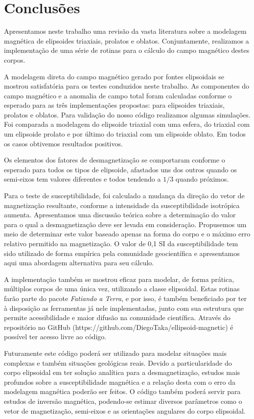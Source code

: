 \chapter{Conclusões}

Apresentamos neste trabalho uma revisão da vasta literatura sobre a modelagem magnética de elipsoides triaxiais, prolatos e oblatos. Conjuntamente, realizamos a implementação de uma série de rotinas para o cálculo do campo magnético destes corpos.

A modelagem direta do campo magnético gerado por fontes elipsoidais se mostrou satisfatória para os testes conduzidos neste trabalho. As componentes do campo magnético e a anomalia de campo total foram calculadas conforme o esperado para as três implementações propostas: para elipsoides triaxiais, prolatos e oblatos.
Para validação do nosso código realizamos algumas simulações. Foi comparada a modelagem do elipsoide triaxial com uma esfera, do triaxial com um elipsoide prolato e por último do triaxial com um elipsoide oblato. Em todos os casos obtivemos resultados positivos.

Os elementos dos fatores de desmagnetização se comportaram conforme o esperado para todos os tipos de elipsoide, afastados uns dos outros quando os semi-eixos tem valores diferentes e todos tendendo a $1/3$ quando próximos.

Para o teste de susceptibilidade, foi calculado a mudança da direção do vetor de magnetização resultante, conforme a intensidade da susceptibilidade isotrópica aumenta. Apresentamos uma discussão teórica sobre a determinação do valor para o qual a desmagnetização deve ser levada em consideração. Propusemos um meio de determinar este valor baseado apenas na forma do corpo e o máximo erro relativo permitido na magnetização. O valor de 0,1 SI da susceptibilidade tem sido utilizado de forma empírica pela comunidade geocientífica e apresentamos aqui uma abordagem alternativa para seu cálculo.

A implementação também se mostrou eficaz para modelar, de forma prática, múltiplos corpos de uma única vez, utilizando a classe elipsoidal. Estas rotinas farão parte do pacote \textit{Fatiando a Terra}, e por isso, é também beneficiado por ter à disposição as ferramentas já nele implementadas, junto com sua estrutura que permite acessibilidade e maior difusão na comunidade científica. Através do repositório no GitHub (https://github.com/DiegoTaka/ellipsoid-magnetic) é possível ter acesso livre ao código.

Futuramente este código poderá ser utilizado para modelar situações mais complexas e também situações geológicas reais. Devido a particularidade do corpo elipsoidal em ter solução analítica para a desmagnetização, estudos mais profundos sobre a susceptibilidade magnética e a relação desta com o erro da modelagem magnética poderão ser feitos. O código também poderá servir para estudos de inversão magnética, podendo-se estimar diversos parâmetros como o vetor de magnetização, semi-eixos e as orientações angulares do corpo elipsoidal.

